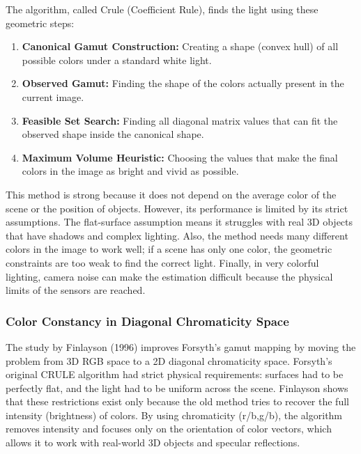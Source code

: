 The algorithm, called Crule (Coefficient Rule), finds the light using these geometric steps:
\begin{enumerate}
\item \textbf{Canonical Gamut Construction:} Creating a shape (convex hull) of all possible colors under a standard white light.
\item \textbf{Observed Gamut:} Finding the shape of the colors actually present in the current image.
\item \textbf{Feasible Set Search:} Finding all diagonal matrix values that can fit the observed shape inside the canonical shape.
\item \textbf{Maximum Volume Heuristic:} Choosing the values that make the final colors in the image as bright and vivid as possible.
\end{enumerate}

This method is strong because it does not depend on the average color of the scene or the position of objects. However, its performance is limited by its strict assumptions. The flat-surface assumption means it struggles with real 3D objects that have shadows and complex lighting. Also, the method needs many different colors in the image to work well; if a scene has only one color, the geometric constraints are too weak to find the correct light. Finally, in very colorful lighting, camera noise can make the estimation difficult because the physical limits of the sensors are reached.

\subsubsection{Color Constancy in Diagonal Chromaticity Space}

The study by Finlayson (1996) \cite{diagonal_chromatography} improves Forsyth's gamut mapping by moving the problem from 3D RGB space to a 2D diagonal chromaticity space. Forsyth’s original CRULE algorithm \cite{baseofgamut} had strict physical requirements: surfaces had to be perfectly flat, and the light had to be uniform across the scene. Finlayson shows that these restrictions exist only because the old method tries to recover the full intensity (brightness) of colors. By using chromaticity (r/b,g/b), the algorithm removes intensity and focuses only on the orientation of color vectors, which allows it to work with real-world 3D objects and specular reflections.

